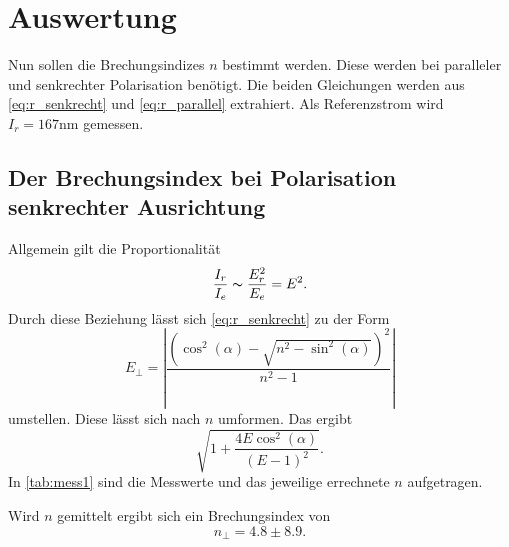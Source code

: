 \section{Auswertung}
\label{sec:Auswertung}

Nun sollen die Brechungsindizes $n$ bestimmt werden.
Diese werden bei paralleler und senkrechter Polarisation benötigt.
Die beiden Gleichungen werden aus \autoref{eq:r_senkrecht} und \autoref{eq:r_parallel} extrahiert.
Als Referenzstrom wird $I_r = 167 \unit{\nano\meter}$ gemessen.


\subsection{Der Brechungsindex bei Polarisation senkrechter Ausrichtung}

Allgemein gilt die Proportionalität 
\begin{equation}
  \frac{I_r}{I_e} \thicksim \frac{E_r^2}{E_e} = E^2.
\end{equation}
Durch diese Beziehung lässt sich \autoref{eq:r_senkrecht} zu der Form
\begin{equation*}
  E_{\perp}=\left|\frac{\left(\cos ^{2}(\alpha) - \sqrt{n^{2}-\sin ^{2}(\alpha)} \right)^{2}}{n^{2}-1}\right|
\end{equation*}
umstellen.
Diese lässt sich nach $n$ umformen.
Das ergibt
\begin{equation}\label{eq:n1}
  \sqrt{1 + \frac{4 E \cos ^2(\alpha)}{(E - 1)^2}}.
\end{equation}
In \autoref{tab:mess1} sind die Messwerte und das jeweilige errechnete $n$ aufgetragen.

Wird $n$ gemittelt ergibt sich ein Brechungsindex von 
\begin{equation*}
  n_{\perp} = 4.8 ± 8.9. 
\end{equation*}


